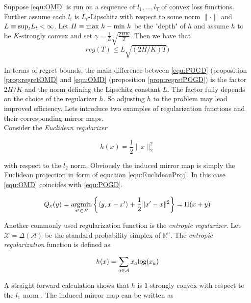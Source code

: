 \begin{proposition}\label{prop:regretOMD}
    Suppose \ref{equ:OMD} is run on a sequence of $l_1,\dots,l_T$ of convex loss functions. Further assume each $l_t$ is $L_t$-Lipschitz with respect to some norm $\|\cdot\|$ and $L \equiv \textnormal{sup}_t L_t < \infty$. Let $H \equiv \textnormal{max } h-\textnormal{min } h$ be the "depth" of $h$ and assume $h$ to be $K$-strongly convex and set $\gamma = \frac{1}{L}\sqrt{\frac{2HK}{T}}$. Then we have that
    \[reg(T) \le L\sqrt{(2H/K)T})\]
\end{proposition}

In terms of regret bounds, the main difference between \ref{equ:POGD} (proposition \ref{prop:regretOMD} and \ref{equ:OMD} (proposition \ref{prop:regretPOGD}) is the factor $2H/K$ and the norm defining the Lipschitz constant $L$. The factor fully depends on the choice of the regularizer $h$. So adjusting $h$ to the problem may lead improved efficiency. Lets introduce two examples of regularization functions and their corresponding mirror maps. \\

Consider the \textit{Euclidean regularizer}

\begin{equation*}
    h(x) = \frac{1}{2}\|x\|_2^2
\end{equation*}

with respect to the $l_2$ norm. Obviously the induced mirror map is simply the Euclidean projection in form of equation \ref{equ:EuclideanProj}. In this case \ref{equ:OMD} coincides with \ref{equ:POGD}. 

\begin{equation*}
    Q_x(y) = \operatorname*{\arg\!\min}_{x'\in \mathcal{X}}\bigg\{\langle y,x-x'\rangle + \frac{1}{2}\|x'-x\|^2\bigg\} = \Pi(x + y)
\end{equation*}

Another commonly used regularization function is the \textit{entropic regularizer}. Let $\mathcal{X} = \Delta(\mathcal{A})$ be the standard probability simplex of $\mathbb{R}^n$. The \textit{entropic regularization} function is defined as

\begin{equation*}
    h(x) = \sum_{a\in\mathcal{A}}x_a\textnormal{log}(x_a)
\end{equation*}

A straight forward calculation shows that $h$ is $1$-strongly convex with respect to the $l_1$ norm \cite{HDRmertikopoulos}. The induced mirror map can be written as

